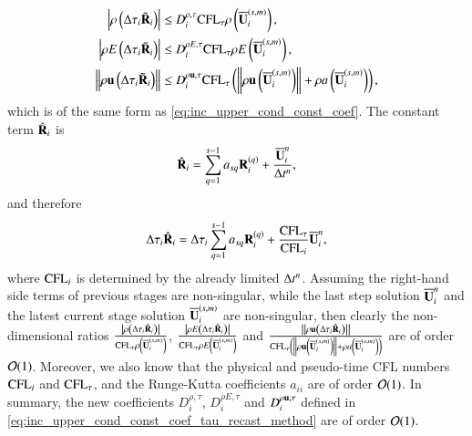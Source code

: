 \begin{equation}
    \begin{aligned}
    \label{eq:inc_upper_cond_const_coef_tau_recasted}
        \left| \rho\left( \mathrm\Delta\tau_i \tilde{\mathbf{R}}_i \right) \right|
        & \leq
        D^{\rho,\tau}_i \text{CFL}_\tau
        \rho\left( \overline{\mathbf{U}}_i^{\left(s,m\right)} \right)
        ,\\
        \left| \rho E\left(\mathrm\Delta\tau_i \tilde{\mathbf{R}}_i \right) \right|
        & \leq
        D^{\rho E,\tau}_i \text{CFL}_\tau
        \rho E\left( \overline{\mathbf{U}}_i^{\left(s,m\right)} \right)
        ,\\
        \left\| \rho \mathbf{u}\left( \mathrm\Delta\tau_i \tilde{\mathbf{R}}_i \right) \right\|
        & \leq
        D^{\rho \mathbf{u},\tau}_i \text{CFL}_\tau
        \left(
        \left\| \rho \mathbf{u}\left( \overline{\mathbf{U}}_i^{\left(s,m\right)} \right) \right\|
         + \rho a \left( \overline{\mathbf{U}}_i^{\left(s,m\right)} \right)
        \right)
        ,\\
    \end{aligned}
\end{equation}
which is of the same form as \eqref{eq:inc_upper_cond_const_coef}.
The constant term  $\hat{\mathbf{R}}_i$ is
\begin{equation}
        \hat{\mathbf{R}}_i  = \sum_{q=1}^{s-1} a_{sq} \mathbf{R}_i^{\left(q\right)} +
    \dfrac{\overline{\mathbf{U}}_i^{n}}{\mathrm\Delta t^n} ,
\end{equation}
and therefore
\begin{equation}
        \mathrm\Delta\tau_i\hat{\mathbf{R}}_i  = \mathrm\Delta\tau_i\sum_{q=1}^{s-1} a_{sq} \mathbf{R}_i^{\left(q\right)} +
    \dfrac{\text{CFL}_\tau}{\text{CFL}_i}\overline{\mathbf{U}}_i^{n} ,
\end{equation}
where $\text{CFL}_i$ is determined by the already limited $\mathrm\Delta t^n$.
Assuming the right-hand side terms of previous stages are non-singular, while 
the last step solution $\overline{\mathbf{U}}_i^n$ and the
latest current stage solution $\overline{\mathbf{U}}_i^{\left(s,m\right)}$ are non-singular, then clearly the 
non-dimensional ratios 
$\frac{\left| \rho\left(\mathrm\Delta\tau_i \hat{\mathbf{R}}_i\right) \right|}
{ \text{CFL}_\tau\rho\left( \overline{\mathbf{U}}_i^{\left(s,m\right)} \right)}$,
$\frac{\left| \rho E\left(\mathrm\Delta\tau_i \hat{\mathbf{R}}_i\right) \right|}
{ \text{CFL}_\tau\rho E\left( \overline{\mathbf{U}}_i^{\left(s,m\right)} \right)}$ and 
$\frac{\left\|\rho\mathbf{u}\left(\mathrm\Delta\tau_i \hat{\mathbf{R}}_i\right) \right\|}
        { \text{CFL}_\tau
        \left(
        \left\|\rho \mathbf{u}\left( \overline{\mathbf{U}}_i^{\left(s,m\right)} \right)\right\|
        + \rho a\left(\overline{\mathbf{U}}_i^{\left(s,m\right)}\right)
        \right)
        }$
are of order $\mathcal{O}(1)$. 
Moreover, we also know that the physical and pseudo-time CFL numbers $\text{CFL}_i$ and $\text{CFL}_\tau$, and the Runge-Kutta coefficients $a_{ii}$ are of order $\mathcal{O}(1)$.
In summary, the new coefficients $D^{\rho,\tau}_i$, $D^{\rho E,\tau}_i$ 
and $D^{\rho \mathbf{u},\tau}_i$ defined in \eqref{eq:inc_upper_cond_const_coef_tau_recast_method}
are of order $\mathcal{O}(1)$. 

